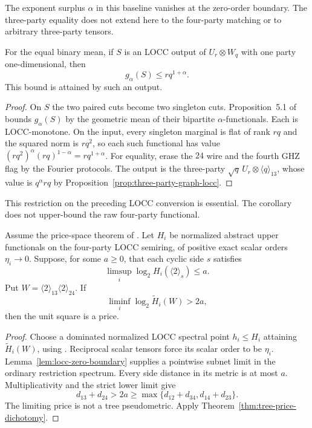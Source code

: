 The exponent surplus $\alpha$ in this baseline vanishes at the
zero-order boundary. The three-party equality does not extend here
to the four-party matching or to arbitrary three-party tensors.

\begin{corollary}
\label{cor:inactive-party-output}
For the equal binary mean, if $S$ is an LOCC output of
$U_r\otimes W_q$ with one party one-dimensional, then
\[
 g_\alpha(S)\leq r q^{1+\alpha}.
\]
This bound is attained by such an output.
\end{corollary}
\begin{proof}
On $S$ the two paired cuts become two singleton cuts.
Proposition~5.1 of \cite{BugarVrana2025} bounds $g_\alpha(S)$ by
the geometric mean of their bipartite $\alpha$-functionals.
Each is LOCC-monotone. On the input, every singleton marginal is
flat of rank $rq$ and the squared norm is $rq^2$, so each such
functional has value
$(rq^2)^\alpha(rq)^{1-\alpha}=rq^{1+\alpha}$.
For equality, erase the $24$ wire and the fourth GHZ flag by the
Fourier protocols. The output is the three-party
$\sqrt q\,U_r\otimes\langle q\rangle_{13}$, whose value is
$q^\alpha rq$ by Proposition~\ref{prop:three-party-graph-locc}.
\end{proof}

This restriction on the preceding LOCC conversion is essential.
The corollary does not upper-bound the raw four-party functional.

\begin{proposition}
\label{prop:locc-nontree-criterion}
Assume the price-space theorem of
\cite[Proposition~C.3]{Anthropic2026}.
Let \(H_i\) be normalized abstract upper functionals on the four-party
LOCC semiring, of positive exact scalar orders \(\eta_i\to0\).
Suppose, for some \(a\geq0\), that each cyclic side \(s\) satisfies
\[
 \limsup_i\log_2 H_i(\langle2\rangle_s)\leq a.
\]
Put \(W=\langle2\rangle_{13}\langle2\rangle_{24}\).
If
\[
 \liminf_i\log_2\widetilde H_i(W)>2a,
\]
then the unit square is a price.
\end{proposition}
\begin{proof}
Choose a dominated normalized LOCC spectral point \(h_i\leq H_i\)
attaining \(\widetilde H_i(W)\), using
\cite[Theorem~3.23]{BugarVrana2025}.
Reciprocal scalar tensors force its scalar order to be \(\eta_i\).
Lemma~\ref{lem:locc-zero-boundary} supplies a pointwise subnet limit
in the ordinary restriction spectrum.
Every side distance in its metric is at most \(a\).
Multiplicativity and the strict lower limit give
\[
 d_{13}+d_{24}>2a
 \geq\max\{d_{12}+d_{34},d_{14}+d_{23}\}.
\]
The limiting price is not a tree pseudometric. Apply
Theorem~\ref{thm:tree-price-dichotomy}.
\end{proof}

